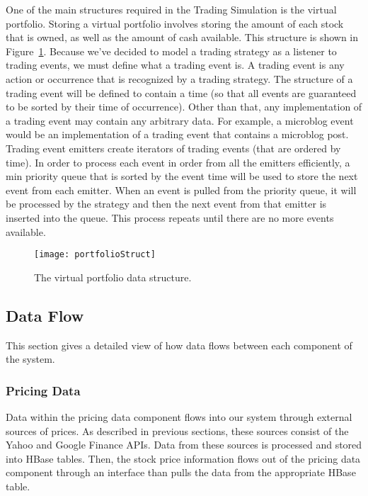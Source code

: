 One of the main structures required in the Trading Simulation is the virtual portfolio.
Storing a virtual portfolio involves storing the amount of each stock that is owned, as well as the amount of cash available.
This structure is shown in Figure~\ref{portfolioStruct}.
Because we've decided to model a trading strategy as a listener to trading events, we must define what a trading event is.
A trading event is any action or occurrence that is recognized by a trading strategy.
The structure of a trading event will be defined to contain a time (so that all events are guaranteed to be sorted by their time of occurrence).
Other than that, any implementation of a trading event may contain any arbitrary data.
For example, a microblog event would be an implementation of a trading event that contains a microblog post.
Trading event emitters create iterators of trading events (that are ordered by time).
In order to process each event in order from all the emitters efficiently, a min priority queue that is sorted by the event time will be used to store the next event from each emitter.
When an event is pulled from the priority queue, it will be processed by the strategy and then the next event from that emitter is inserted into the queue.
This process repeats until there are no more events available.

\begin{figure}[h]
  \label{portfolioStruct}
  \begin{center}
    \texttt{[image: portfolioStruct]}
  \end{center}
  \caption{The virtual portfolio data structure.}
\end{figure}

\subsection{Data Flow}

This section gives a detailed view of how data flows between each component of the system.

\subsubsection{Pricing Data}

Data within the pricing data component flows into our system through external sources of prices.
As described in previous sections, these sources consist of the Yahoo and Google Finance APIs.
Data from these sources is processed and stored into HBase tables.
Then, the stock price information flows out of the pricing data component through an interface than pulls the data from the appropriate HBase table.

